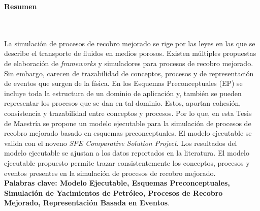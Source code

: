 \newpage{\pagestyle{empty}\cleardoublepage}

\newpage
\textbf{\LARGE Resumen}
\\\\

La simulación de procesos de recobro mejorado se rige por las leyes en las que se describe el transporte de fluidos en medios porosos. Existen múltiples propuestas de elaboración de \textit{frameworks} y simuladores para procesos de recobro mejorado. Sin embargo, carecen de trazabilidad de conceptos, procesos y de representación de eventos que surgen de la física. En los Esquemas Preconceptuales (EP) se incluye toda la estructura de un dominio de aplicación y, también se pueden representar los procesos que se dan en tal dominio. Estos, aportan cohesión, consistencia y trazabilidad entre conceptos y procesos. Por lo que, en esta Tesis de Maestría se propone un modelo ejecutable para la simulación de procesos de recobro mejorado basado en esquemas preconceptuales. El modelo ejecutable se valida con el noveno \textit{SPE Comparative Solution Project}. Los resultados del modelo ejecutable se ajustan a los datos reportados en la literatura. El modelo ejecutable propuesto permite trazar consistentemente los conceptos, procesos y eventos presentes en la simulación de procesos de recobro mejorado.\\


\textbf{\small Palabras clave: Modelo Ejecutable, Esquemas Preconceptuales, Simulación de Yacimientos de Petróleo, Procesos de Recobro Mejorado, Representación Basada en Eventos}.\\





